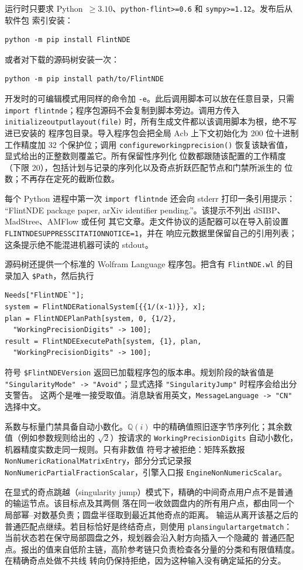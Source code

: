 \documentclass[11pt,a4paper]{ctexart}
\renewcommand{\_}{\origunderscore\allowbreak}
\begin{document}
运行时只要求 Python~$\geq3.10$、\texttt{python-flint>=0.6} 和 \texttt{sympy>=1.12}。发布后从软件包
索引安装：
\begin{verbatim}
python -m pip install FlintNDE
\end{verbatim}
或者对下载的源码树安装一次：
\begin{verbatim}
python -m pip install path/to/FlintNDE
\end{verbatim}
开发时的可编辑模式用同样的命令加 \texttt{-e}。此后调用脚本可以放在任意目录，只需
\texttt{import flintnde}；程序包源码不会复制到脚本旁边。调用方传入
\texttt{initialize\_output\_layout(\_\_file\_\_)} 时，所有生成文件都以该调用脚本为根，绝不写进已安装的
程序包目录。导入程序包会把全局 Acb 上下文初始化为 200 位十进制工作精度加 32 个保护位；调用
\texttt{configure\_working\_precision()} 恢复该缺省值，显式给出的正整数则覆盖它。所有保留性序列化
位数都跟随该配置的工作精度（下限 20），包括计划与记录的序列化以及奇点折跃匹配节点和门禁所派生的
位数；不再存在定死的截断位数。

每个 Python 进程中第一次 \texttt{import flintnde} 还会向 stderr 打印一条引用提示：
``FlintNDE package paper, arXiv identifier pending.''。该提示不列出 dSIBP、MadStree、AMFlow 或任何
其它文章。走文件协议的适配器可以在导入前设置 \texttt{FLINTNDE\_SUPPRESS\_CITATION\_NOTICE=1}，并在
响应元数据里保留自己的引用列表；这条提示绝不能混进机器可读的 stdout。

源码树还提供一个标准的 Wolfram Language 程序包。把含有 \texttt{FlintNDE.wl} 的目录加入
\texttt{\$Path}，然后执行
\begin{verbatim}
Needs["FlintNDE`"];
system = FlintNDERationalSystem[{{1/(x-1)}}, x];
plan = FlintNDEPlanPath[system, 0, {1/2},
  "WorkingPrecisionDigits" -> 100];
result = FlintNDEExecutePath[system, {1}, plan,
  "WorkingPrecisionDigits" -> 100];
\end{verbatim}
符号 \texttt{\$FlintNDEVersion} 返回已加载程序包的版本串。规划阶段的缺省值是
\texttt{"SingularityMode" -> "Avoid"}；显式选择 \texttt{"SingularityJump"} 时程序会给出分支警告。
这两个是唯一接受取值。消息缺省用英文，\texttt{MessageLanguage -> "CN"} 选择中文。

系数与标量门禁具备自动小数化。$\mathbb Q(i)$ 中的精确值照旧逐字节序列化；其余数值（例如参数规则给出的
$\sqrt2$）按请求的 \texttt{WorkingPrecisionDigits} 自动小数化，机器精度实数走同一规则。只有非数值
符号才被拒绝：矩阵系数报 \texttt{NonNumericRationalMatrixEntry}，部分分式记录报
\texttt{NonNumericPartialFractionScalar}，引擎入口报 \texttt{EngineNonNumericScalar}。

在显式的奇点跳越（singularity jump）模式下，精确的中间奇点用户点不是普通的输运节点。该目标点及其两侧
落在同一收敛圆盘内的所有用户点，都由同一个局部幂--对数基负责；圆盘半径取到最近其他奇点的距离。
输运从离开该基之后的普通匹配点继续。若目标恰好是终结奇点，则使用
\texttt{plan\_singular\_target\_match}：当前状态若在保守局部圆盘之外，规划器会沿入射方向插入一个隐藏的
普通匹配点。报出的值来自低阶主链，高阶参考链只负责检查各分量的分类和有限值精度。在精确奇点处做不共线
转向仍保持拒绝，因为这种输入没有确定延拓的分支。
\end{document}
